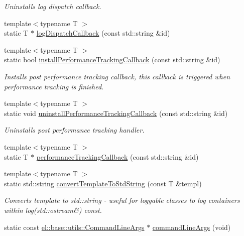 \begin{DoxyCompactItemize}
\begin{DoxyCompactList}\small\item\em Uninstalls log dispatch callback. \end{DoxyCompactList}\item 
{\footnotesize template$<$typename T $>$ }\\static T $\ast$ \hyperlink{classel_1_1_helpers_aa01d59ca141bc75c4fdd78a34234611b}{log\+Dispatch\+Callback} (const std\+::string \&id)
\item 
{\footnotesize template$<$typename T $>$ }\\static bool \hyperlink{classel_1_1_helpers_a93e2727d3a7a5c06ccc41a2ae7fe1835}{install\+Performance\+Tracking\+Callback} (const std\+::string \&id)
\begin{DoxyCompactList}\small\item\em Installs post performance tracking callback, this callback is triggered when performance tracking is finished. \end{DoxyCompactList}\item 
{\footnotesize template$<$typename T $>$ }\\static void \hyperlink{classel_1_1_helpers_af1c5a4951991179dca4879ba05fb67a6}{uninstall\+Performance\+Tracking\+Callback} (const std\+::string \&id)
\begin{DoxyCompactList}\small\item\em Uninstalls post performance tracking handler. \end{DoxyCompactList}\item 
{\footnotesize template$<$typename T $>$ }\\static T $\ast$ \hyperlink{classel_1_1_helpers_a007844d35095b26301c9218b29d74049}{performance\+Tracking\+Callback} (const std\+::string \&id)
\item 
{\footnotesize template$<$typename T $>$ }\\static std\+::string \hyperlink{classel_1_1_helpers_a8b032e32cd042ddc4fef4e814bad1082}{convert\+Template\+To\+Std\+String} (const T \&templ)
\begin{DoxyCompactList}\small\item\em Converts template to std\+::string -\/ useful for loggable classes to log containers within log(std\+::ostream\&) const. \end{DoxyCompactList}\item 
static const \hyperlink{classel_1_1base_1_1utils_1_1_command_line_args}{el\+::base\+::utils\+::\+Command\+Line\+Args} $\ast$ \hyperlink{classel_1_1_helpers_a83bab44f77a4961f8f5231e7ce9917bb}{command\+Line\+Args} (void)

\end{DoxyCompactItemize}
